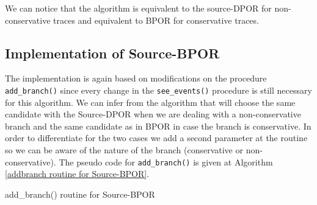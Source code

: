 We can notice that the algorithm is equivalent to the source-DPOR for non-conservative traces and equivalent to BPOR for conservative traces.

\subsection{Implementation of Source-BPOR}
The implementation is again based on modifications on the procedure \verb|add_branch()| since every change in the \verb|see_events()| procedure is still necessary for this algorithm.
We can infer from the algorithm that will choose the same candidate with the Source-DPOR when we are dealing with a non-conservative branch and the same candidate as in BPOR
in case the branch is conservative. In order to differentiate for the two cases we add a second parameter at the routine so we can be aware of the nature of the
branch (conservative or non-conservative). The pseudo code for \verb|add_branch()| is given at Algorithm \ref{addbranch routine for Source-BPOR}.

\begin{algorithm}[H]
    \caption{add\_branch() routine for Source-BPOR}
    \label{addbranch routine for Source-BPOR}
\end{algorithm}

